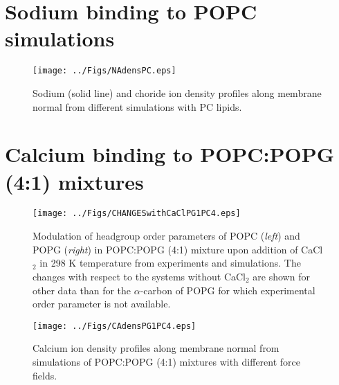 \documentclass[journal=jpcbfk]{achemso}
\begin{document}
\clearpage

\section{Sodium binding to POPC simulations}

\begin{figure}[]
  \centering
  \texttt{[image: ../Figs/NAdensPC.eps]}
  \caption{\label{NAdensPC}
    Sodium (solid line) and choride ion density profiles along membrane normal
    from different simulations with PC lipids.
  }
\end{figure}

\clearpage

\section{Calcium binding to POPC:POPG (4:1) mixtures}
\begin{figure*}[]
  \centering
  \texttt{[image: ../Figs/CHANGESwithCaClPG1PC4.eps]}
  \caption{\label{changesWITHCaClPG1PC4}
    Modulation of headgroup order parameters of POPC ({\it left}) and POPG ({\it right}) in POPC:POPG (4:1)
    mixture upon addition of CaCl$_2$ in 298 K temperature from experiments \cite{macdonald87} and simulations.
    The changes with respect to the systems without CaCl$_2$ are shown for other data than
    for the $\alpha$-carbon of POPG for which experimental order parameter is not available.
  }
\end{figure*}

\begin{figure}[]
  \centering
  \texttt{[image: ../Figs/CAdensPG1PC4.eps]}
  \caption{\label{CAdensPG1PC4}
    Calcium ion density profiles along membrane normal from simulations of POPC:POPG (4:1) mixtures with different force fields.
  }
\end{figure}


\clearpage

\end{document}
